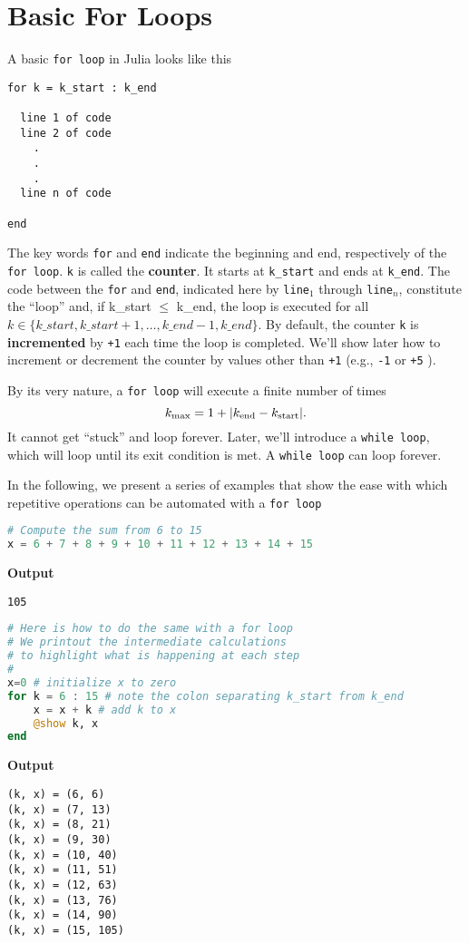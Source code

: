 \section{Basic For Loops}

A basic \texttt{for\,loop} in Julia looks like this
\begin{verbatim}
for k = k_start : k_end  

  line 1 of code  
  line 2 of code  
    .  
    .  
    .  
  line n of code 
 
end
\end{verbatim}

The key words \texttt{for} and \texttt{end} indicate the beginning and end, respectively of the \texttt{for\,loop}. \texttt{k} is called the \textbf{counter}. It starts at \texttt{k\_start} and ends at \texttt{k\_end}. The code between the \texttt{for} and \texttt{end}, indicated here by \texttt{line$_1$} through \texttt{line$_n$}, constitute the ``loop'' and, if k\_start $\le$ k\_end, the loop is executed for all $k\in \{k\_start, k\_start+1, \ldots, k\_end -1, k\_end  \}$. By default, the counter \texttt{k} is \textbf{incremented} by \texttt{+1} each time the loop is completed. We'll show later how to increment or decrement the counter by values other than \texttt{+1} (e.g., \texttt{-1} or \texttt{+5} ).

\begin{rem}
By its very nature, a \texttt{for\,loop} will execute a finite number of times
$$k_{\rm max} = 1 + |k_{\rm end} - k_{\rm start}|. $$ It cannot get ``stuck'' and loop forever. Later, we'll introduce a \texttt{while\,loop}, which will loop until its exit condition is met. A \texttt{while\,loop} can loop forever. 
\end{rem}

In the following, we present a series of examples that show the ease with which repetitive operations can be automated with a \texttt{for\,loop}
\begin{lstlisting}[language=Julia,style=mystyle]
# Compute the sum from 6 to 15
x = 6 + 7 + 8 + 9 + 10 + 11 + 12 + 13 + 14 + 15
\end{lstlisting}
\textbf{Output} 
\begin{verbatim}
105
\end{verbatim}


\begin{lstlisting}[language=Julia,style=mystyle]
# Here is how to do the same with a for loop
# We printout the intermediate calculations
# to highlight what is happening at each step
#
x=0 # initialize x to zero
for k = 6 : 15 # note the colon separating k_start from k_end
    x = x + k # add k to x
    @show k, x
end
\end{lstlisting}
\textbf{Output} 
\begin{verbatim}
(k, x) = (6, 6)
(k, x) = (7, 13)
(k, x) = (8, 21)
(k, x) = (9, 30)
(k, x) = (10, 40)
(k, x) = (11, 51)
(k, x) = (12, 63)
(k, x) = (13, 76)
(k, x) = (14, 90)
(k, x) = (15, 105)
\end{verbatim}

